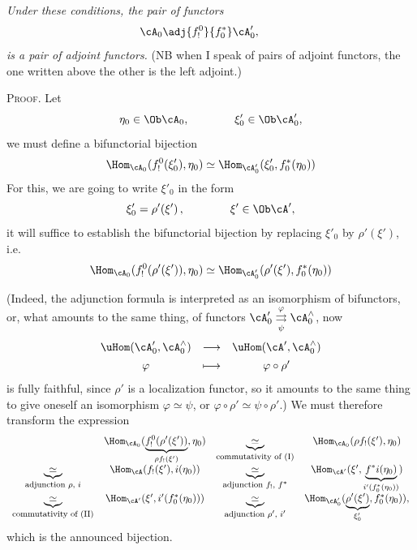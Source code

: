 \textit{Under these conditions, the pair of functors}
\[
\cA_0 \adj{f_!^0}{f_0^*} \cA'_0, \qquad 
\]
\textit{is a pair of adjoint functors.} (NB when I speak of pairs of adjoint functors, the one written above the other is the left adjoint.)

\textsc{Proof}. Let
\[
\eta_0 \in \Ob \cA_0, \qquad\qquad \xi'_0 \in \Ob \cA'_0,
\]
we must define a bifunctorial bijection
\[
\Hom_{\cA_0}(f_!^0(\xi'_0), \eta_0) \simeq \Hom_{\cA'_0}(\xi'_0, f_0^*(\eta_0))
\]
For this, we are going to write $\xi'_0$ in the form
\[
\xi'_0 = \rho'(\xi')\,, \qquad\qquad \xi' \in \Ob \cA',
\]
it will suffice to establish the bifunctorial bijection by replacing $\xi'_0$ by $\rho'(\xi')$, i.e.
\[
\Hom_{\cA_0}(f_!^0(\rho'(\xi')), \eta_0) \simeq \Hom_{\cA'_0}(\rho'(\xi'), f_0^*(\eta_0))
\]



(Indeed, the adjunction formula is interpreted as an isomorphism of bifunctors, or, what amounts to the same thing, of functors $\cA'_0 \mathrel{\underset{\psi}{\overset{\varphi}{\rightrightarrows}}} \cA_0^{\wedge}$, now
\[
\begin{array}{ccc}
\uHom(\cA'_0, \cA_0^{\wedge}) & \longrightarrow & \uHom(\cA', \cA_0^{\wedge}) \\[1ex]
\varphi & \longmapsto & \varphi \circ \rho'
\end{array}
\]
is fully faithful, since $\rho'$ is a localization functor, so it amounts to the same thing to give oneself an isomorphism $\varphi \simeq \psi$, or $\varphi \circ \rho' \simeq \psi \circ \rho'$.) We must therefore transform the expression
\[
\begin{array}{cccc}
 & \Hom_{\cA_0}(\underbrace{f_!^0(\rho'(\xi'))}_{\rho f_!(\xi')}, \eta_0) & \underbrace{\simeq}_{\text{\footnotesize commutativity of (I)}} & \Hom_{\cA_0}(\rho f_!(\xi'), \eta_0) \\[3ex]
\underbrace{\simeq}_{\text{\footnotesize adjunction $\rho$, $i$}} & \Hom_{\cA}(f_!(\xi'), i(\eta_0)) & \underbrace{\simeq}_{\text{\footnotesize adjunction $f_!$, $f^*$}} & \Hom_{\cA'}(\xi', \underbrace{f^*i(\eta_0)}_{i'(f_0^*(\eta_0))}) \\[3ex]
\underbrace{\simeq}_{\text{\footnotesize commutativity of (II)}} & \Hom_{\cA'}(\xi', i'(f_0^*(\eta_0))) & \underbrace{\simeq}_{\text{\footnotesize adjunction $\rho'$, $i'$}} & \Hom_{\cA'_0}(\underbrace{\rho'(\xi')}_{\xi'_0}, f_0^*(\eta_0)),
\end{array}
\]
which is the announced bijection.

